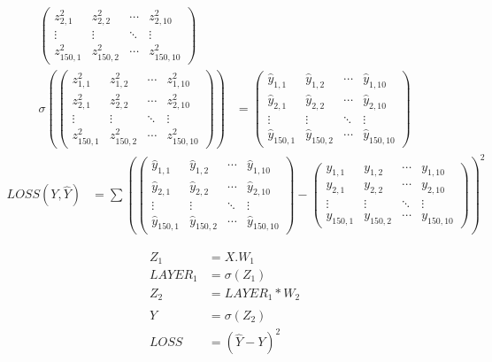 \begin{footnotesize}
\begin{align*}
\begin{pmatrix}
z^2_{2,1} & z^2_{2,2} & \cdots & z^2_{2,10} \\
\vdots  & \vdots  & \ddots & \vdots  \\
z^2_{150,1} & z^2_{150,2} & \cdots & z^2_{150,10} 
\end{pmatrix}
\\
\sigma(
\begin{pmatrix}
z^2_{1,1} & z^2_{1,2} & \cdots & z^2_{1,10} \\
z^2_{2,1} & z^2_{2,2} & \cdots & z^2_{2,10} \\
\vdots  & \vdots  & \ddots & \vdots  \\
z^2_{150,1} & z^2_{150,2} & \cdots & z^2_{150,10}
\end{pmatrix}
)
&=
\begin{pmatrix}
\hat{y}_{1,1} & \hat{y}_{1,2} & \cdots & \hat{y}_{1,10} \\
\hat{y}_{2,1} & \hat{y}_{2,2} & \cdots & \hat{y}_{2,10} \\
\vdots  & \vdots  & \ddots & \vdots  \\
\hat{y}_{150,1} & \hat{y}_{150,2} & \cdots & \hat{y}_{150,10} 
\end{pmatrix}
\end{align*}
\begin{align*}
LOSS(Y, \hat{Y}) &= \sum (
\begin{pmatrix}
\hat{y}_{1,1} & \hat{y}_{1,2} & \cdots & \hat{y}_{1,10} \\
\hat{y}_{2,1} & \hat{y}_{2,2} & \cdots & \hat{y}_{2,10} \\
\vdots  & \vdots  & \ddots & \vdots  \\
\hat{y}_{150,1} & \hat{y}_{150,2} & \cdots & \hat{y}_{150,10} 
\end{pmatrix}
-
\begin{pmatrix}
y_{1,1} & y_{1,2} & \cdots & y_{1,10} \\
y_{2,1} & y_{2,2} & \cdots & y_{2,10} \\
\vdots  & \vdots  & \ddots & \vdots  \\
y_{150,1} & y_{150,2} & \cdots & y_{150,10} 
\end{pmatrix}
)^2
\end{align*}

\begin{align*}
Z_1 &= X.W_1 \\
LAYER_1 &= \sigma (Z_1) \\
Z_2 &= LAYER_1 * W_2 \\
\hat{Y} &= \sigma (Z_2) \\
LOSS &= (\hat{Y} -Y)^2  
\end{align*}
\end{footnotesize}

